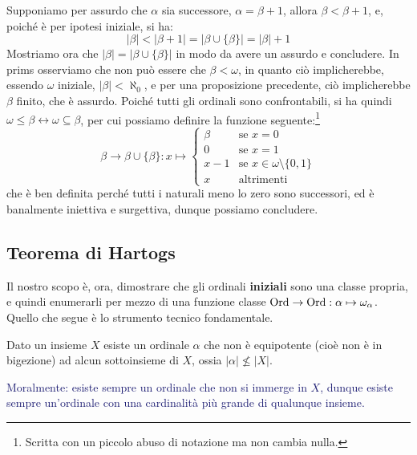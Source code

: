 \begin{soln}
	Supponiamo per assurdo che $\alpha$ sia successore, $\alpha = \beta + 1$, allora $\beta < \beta + 1$, e, poich\'e \`e per ipotesi iniziale, si ha:
	\[ |\beta| < |\beta + 1| = |\beta \cup \{\beta\}| = |\beta| + 1
		\]
	Mostriamo ora che $|\beta| = |\beta \cup \{\beta\}|$ in modo da avere un assurdo e concludere. In prims osserviamo che non pu\`o essere che $\beta < \omega$, in quanto ci\`o implicherebbe, essendo $\omega$ iniziale, $|\beta| < \aleph_0$, e per una proposizione precedente,
	ci\`o implicherebbe $\beta$ finito, che \`e assurdo. Poich\'e tutti gli ordinali sono confrontabili, si ha quindi $\omega \leq \beta \leftrightarrow \omega \subseteq \beta$, per cui possiamo definire la funzione seguente:\footnote{Scritta con un piccolo abuso di notazione ma non cambia nulla.}
	\[ \beta \to \beta \cup \{\beta\} : x \mapsto \begin{cases}
		\beta &\text{se $x = 0$}\\
		0 &\text{se $x = 1$}\\
		x-1 &\text{se $x \in \omega \setminus\{0,1\}$}\\
		x &\text{altrimenti}
	\end{cases}
		\]
	che \`e ben definita perch\'e tutti i naturali meno lo zero sono successori, ed \`e banalmente iniettiva e surgettiva, dunque possiamo concludere.
\end{soln}

\subsection{Teorema di Hartogs}
Il nostro scopo \`e, ora, dimostrare che gli ordinali \textbf{iniziali} sono una classe propria, e quindi enumerarli per mezzo di una funzione classe $\operatorname{Ord} \rightarrow \operatorname{Ord} : \alpha \mapsto \omega_\alpha$.
Quello che segue \`e lo strumento tecnico fondamentale.

\begin{theorem}
	Dato un insieme $X$ esiste un ordinale $\alpha$ che non \`e equipotente (cio\`e non \`e in bigezione) ad alcun sottoinsieme di $X$, ossia $|\alpha| \not\leq |X|$.
\end{theorem}

\textcolor{MidnightBlue}{Moralmente: esiste sempre un ordinale che non si immerge in $X$, dunque esiste sempre un'ordinale con una cardinalit\`a pi\`u grande di qualunque insieme.}

